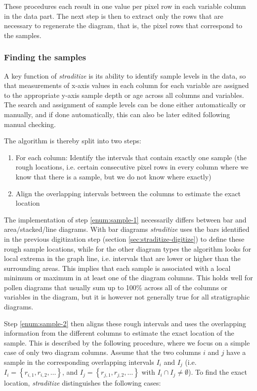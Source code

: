 \begin{refsection}
These procedures each result in one value per pixel row in each variable column in the data part. The next step is then to extract only the rows that are necessary to regenerate the diagram, that is, the pixel rows that correspond to the samples.

\subsubsection{Finding the samples}  \label{sec:straditize-samples}
A key function of \emph{straditize} is its ability to identify sample levels in the data, so that measurements of x-axis values in each column for each variable are assigned to the appropriate y-axis sample depth or age across all columns and variables. The search and assignment of sample levels can be done either automatically or manually, and if done automatically, this can also be later edited following manual checking.  

The algorithm is thereby split into two steps:

\begin{enumerate}
	\item For each column: Identify the intervals that contain exactly one sample (the rough locations, i.e. certain consecutive pixel rows in every column where we know that there is a sample, but we do not know where exactly) \label{enum:sample-1}
	\item Align the overlapping intervals between the columns to estimate the exact location \label{enum:sample-2}
\end{enumerate}

The implementation of step \ref{enum:sample-1} necessarily differs between 
bar and area/stacked/line diagrams. With bar diagrams \emph{straditize} uses the bars identified in the
previous digitization step (section \ref{sec:straditize-digitize}) to define these rough sample locations, while for the other diagram types the algorithm looks for local extrema in the graph line, i.e. intervals that are lower or higher than the surrounding areas. This implies that each sample is associated with a local minimum or maximum in at least one of the diagram columns. This holds well for pollen diagrams that usually sum up to 100\% across all of the columns or variables in the diagram, but it is however not generally true for all stratigraphic diagrams.

Step \ref{enum:sample-2} then aligns these rough intervals and uses the overlapping information from the different columns to estimate the exact location of the sample. This is described by the following procedure, where we focus on a simple case of only two diagram columns. Assume that the two columns $i$ and $j$ have a sample in the corresponding overlapping intervals $I_i$ and $I_j$ (i.e. $I_i = \left\{r_{i,1}, r_{i,2}, \ldots\right\}$, and $I_j = \left\{r_{j,1}, r_{j,2}, \ldots\right\}$ with $I_i \cap I_j \neq \emptyset$). To find the exact location, \emph{straditize} distinguishes the following cases:


\end{refsection}
